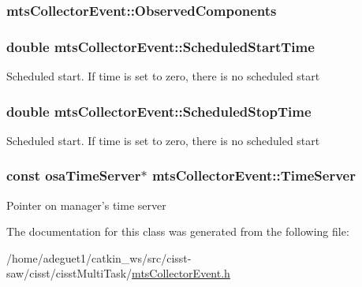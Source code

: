 \hypertarget{classmts_collector_event_a0f4a7cc03d7c29dc4b853fc248415578}{
\subsubsection[{Observed\-Components}]{ mts\-Collector\-Event\-::\-Observed\-Components\hspace{0.3cm}{\ttfamily [protected]}}}\label{classmts_collector_event_a0f4a7cc03d7c29dc4b853fc248415578}
\hypertarget{classmts_collector_event_a16f82074f7e622b72a100c8c99c1354e}{
\subsubsection[{Scheduled\-Start\-Time}]{\setlength{\rightskip}{0pt plus 5cm}double mts\-Collector\-Event\-::\-Scheduled\-Start\-Time\hspace{0.3cm}{\ttfamily [protected]}}}\label{classmts_collector_event_a16f82074f7e622b72a100c8c99c1354e}
Scheduled start. If time is set to zero, there is no scheduled start \hypertarget{classmts_collector_event_ad7213ee6804878731b6d0d7effa3dd0a}{
\subsubsection[{Scheduled\-Stop\-Time}]{\setlength{\rightskip}{0pt plus 5cm}double mts\-Collector\-Event\-::\-Scheduled\-Stop\-Time\hspace{0.3cm}{\ttfamily [protected]}}}\label{classmts_collector_event_ad7213ee6804878731b6d0d7effa3dd0a}
Scheduled start. If time is set to zero, there is no scheduled start \hypertarget{classmts_collector_event_a0bf692d3a1e6c8eb40b4ae32053dba2e}{
\subsubsection[{Time\-Server}]{\setlength{\rightskip}{0pt plus 5cm}const {\bf osa\-Time\-Server}$\ast$ mts\-Collector\-Event\-::\-Time\-Server\hspace{0.3cm}{\ttfamily [protected]}}}\label{classmts_collector_event_a0bf692d3a1e6c8eb40b4ae32053dba2e}
Pointer on manager's time server 

The documentation for this class was generated from the following file\-:\begin{DoxyCompactItemize}
\item 
/home/adeguet1/catkin\-\_\-ws/src/cisst-\/saw/cisst/cisst\-Multi\-Task/\hyperlink{mts_collector_event_8h}{mts\-Collector\-Event.\-h}\end{DoxyCompactItemize}
